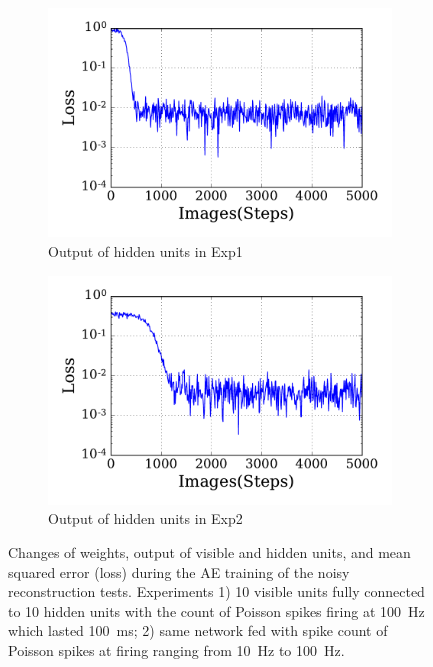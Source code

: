 \begin{figure}
\begin{subfigure}[t]{0.48\textwidth}
		\DIFaddendFL \includegraphics[width=\textwidth]{pics_sdlm/21_exp_AE_noise/exp1_loss_s.pdf}
		\caption{Output of hidden units in Exp1}
	\end{subfigure}
	\DIFdelbeginFL %
\DIFdelendFL \DIFaddbeginFL \begin{subfigure}[t]{0.48\textwidth}
		\DIFaddendFL \includegraphics[width=\textwidth]{pics_sdlm/21_exp_AE_noise/exp2_loss_s.pdf}
		\caption{Output of hidden units in Exp2}
	\end{subfigure}
	\caption{Changes of weights, output of visible and hidden units, and mean squared error (loss) during the AE training of the noisy reconstruction tests. 
		Experiments 1) 10 visible units fully connected to 10 hidden units with the count of Poisson spikes firing at 100~Hz which lasted 100~ms; 2) \DIFaddbeginFL {}\DIFaddendFL same network fed with spike count of Poisson spikes at firing \DIFdelbeginFL {}\DIFdelendFL \DIFaddbeginFL {}\DIFaddendFL ranging from 10~Hz to 100~Hz.}
	\label{fig:ae_noise}
\end{figure}

